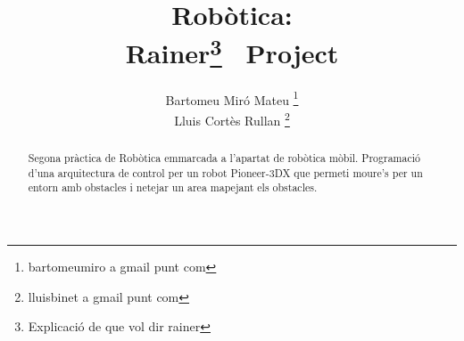 \documentclass[a4paper,11pt]{scrartcl}
\title{Robòtica: \\ Rainer\footnote{Explicació de que vol dir rainer} \ Project}
\author{ Bartomeu Miró Mateu \thanks{bartomeumiro a gmail punt com} \\
	 Lluis Cortès Rullan \thanks{lluisbinet a gmail punt com} }
\begin{document}
  \maketitle

  \begin{abstract}
    Segona pràctica de Robòtica emmarcada a l'apartat de robòtica mòbil.
    Programació d'una arquitectura de control per un robot Pioneer-3DX que
    permeti moure’s per un entorn amb obstacles i netejar un area mapejant
    els obstacles.
  \end{abstract}

  \newpage
  \setcounter{page}{2}
  \tableofcontents
  \newpage

  
  
  
  
  
  
\end{document}
